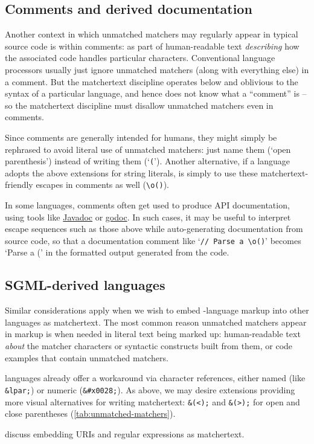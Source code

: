 

\subsection{Comments and derived documentation}

Another context in which unmatched matchers may regularly appear
in typical source code is within comments:
\eg as part of human-readable text \emph{describing}
how the associated code handles particular characters.
Conventional language processors usually just ignore unmatched matchers
(along with everything else) in a comment.
But the matchertext discipline operates below and oblivious to
the syntax of a particular language,
and hence does not know what a ``comment'' is --
so the matchertext discipline must disallow unmatched matchers even in comments.

Since comments are generally intended for humans,
they might simply be rephrased
to avoid literal use of unmatched matchers:
\eg just name them (`open parenthesis')
instead of writing them (`\verb|(|').
Another alternative,
if a language adopts the above extensions for string literals,
is simply to use these matchertext-friendly escapes in comments as well
(\eg \verb|\o()|).

In some languages,
comments often get used to produce API documentation,
using tools like \href{https://www.oracle.com/java/technologies/javase/javadoc-tool.html}{Javadoc}
or \href{https://pkg.go.dev/golang.org/x/tools/cmd/godoc}{godoc}.
In such cases,
it may be useful to interpret escape sequences such as those above
while auto-generating documentation from source code,
so that a documentation comment like `\verb|// Parse a \o()|'
becomes `Parse a (' in the formatted output generated from the code.


\subsection{SGML-derived languages}
\label{sec:embed:ml}

Similar considerations apply
when we wish to embed \ml-language markup
into other languages as matchertext.
The most common reason unmatched matchers appear in markup
is when needed in literal text being marked up:
\eg human-readable text \emph{about} the matcher characters
or syntactic constructs built from them,
or code examples that contain unmatched matchers.

\ml languages already offer a workaround
via character references,
either named (like \verb|&lpar;|)
or numeric (\verb|&#x0028;|).
As above,
we may desire extensions
providing more visual alternatives for writing matchertext:
\eg \verb|&(<);| and \verb|&(>);|
for open and close parentheses (\cref{tab:unmatched-matchers}).

 discuss embedding
URIs and regular expressions as matchertext.
